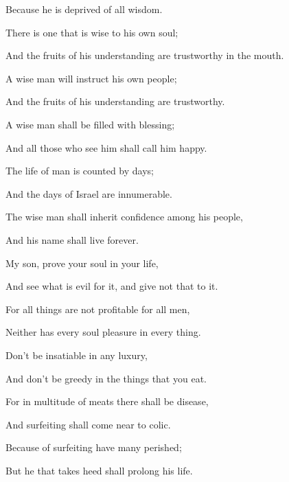 {\par }{\Q Because he is deprived of all wisdom.
\par }{\Q {}There is one that is wise to his own soul;
\par }{\Q And the fruits of his understanding are trustworthy in the mouth.
\par }{\Q {}A wise man will instruct his own people;
\par }{\Q And the fruits of his understanding are trustworthy.
\par }{\Q {}A wise man shall be filled with blessing;
\par }{\Q And all those who see him shall call him happy.
\par }{\Q {}The life of man is counted by days;
\par }{\Q And the days of Israel are innumerable.
\par }{\Q {}The wise man shall inherit confidence among his people,
\par }{\Q And his name shall live forever.
\par }{\BB \par }{\Q {}My son, prove your soul in your life,
\par }{\Q And see what is evil for it, and give not that to it.
\par }{\Q {}For all things are not profitable for all men,
\par }{\Q Neither has every soul pleasure in every thing.
\par }{\Q {}Don’t be insatiable in any luxury,
\par }{\Q And don’t be greedy in the things that you eat.
\par }{\Q {}For in multitude of meats there shall be disease,
\par }{\Q And surfeiting shall come near to colic.
\par }{\Q {}Because of surfeiting have many perished;
\par }{\Q But he that takes heed shall prolong his life.
\par }{\BB \par }

